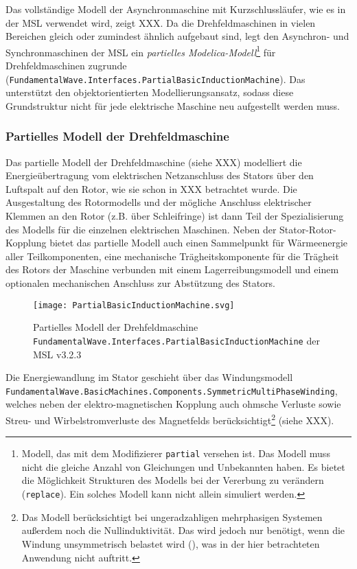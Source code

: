 Das vollständige Modell der Asynchronmaschine mit Kurzschlussläufer, wie
es in der MSL verwendet wird, zeigt XXX. Da die Drehfeldmaschinen in
vielen Bereichen gleich oder zumindest ähnlich aufgebaut sind, legt
\cite{ @kralModelicaObjektorientierteModellbildung2019 } den Asynchron-
und Synchronmaschinen der MSL ein \emph{partielles
Modelica-Modell}\footnote{Modell, das mit dem Modifizierer
  \texttt{partial} versehen ist. Das Modell muss nicht die gleiche
  Anzahl von Gleichungen und Unbekannten haben. Es bietet die
  Möglichkeit Strukturen des Modells bei der Vererbung zu verändern
  (\texttt{replace}). Ein solches Modell kann nicht allein simuliert
  werden.} für Drehfeldmaschinen zugrunde
(\texttt{FundamentalWave.Interfaces.PartialBasicInductionMachine}). Das
unterstützt den objektorientierten Modellierungsansatz, sodass diese
Grundstruktur nicht für jede elektrische Maschine neu aufgestellt werden
muss.

\hypertarget{partielles-modell-der-drehfeldmaschine}{%
\subsubsection{Partielles Modell der
Drehfeldmaschine}\label{partielles-modell-der-drehfeldmaschine}}

Das partielle Modell der Drehfeldmaschine (siehe XXX) modelliert die
Energieübertragung vom elektrischen Netzanschluss des Stators über den
Luftspalt auf den Rotor, wie sie schon in XXX betrachtet wurde. Die
Ausgestaltung des Rotormodells und der mögliche Anschluss elektrischer
Klemmen an den Rotor (z.B. über Schleifringe) ist dann Teil der
Spezialisierung des Modells für die einzelnen elektrischen Maschinen.
Neben der Stator-Rotor-Kopplung bietet das partielle Modell auch einen
Sammelpunkt für Wärmeenergie aller Teilkomponenten, eine mechanische
Trägheitskomponente für die Trägheit des Rotors der Maschine verbunden
mit einem Lagerreibungsmodell und einem optionalen mechanischen
Anschluss zur Abstützung des Stators.

\begin{figure}
\centering
\texttt{[image: PartialBasicInductionMachine.svg]}
\caption{Partielles Modell der Drehfeldmaschine
\texttt{FundamentalWave.Interfaces.PartialBasicInductionMachine} der MSL
v3.2.3}
\end{figure}

Die Energiewandlung im Stator geschieht über das Windungsmodell
\texttt{FundamentalWave.BasicMachines.Components.SymmetricMultiPhaseWinding},
welches neben der elektro-magnetischen Kopplung auch ohmsche Verluste
sowie Streu- und Wirbelstromverluste des Magnetfelds
berücksichtigt\footnote{Das Modell berücksichtigt bei ungeradzahligen
  mehrphasigen Systemen außerdem noch die Nullinduktivität. Das wird
  jedoch nur benötigt, wenn die Windung unsymmetrisch belastet wird
  (\cite[S. 193]{kralModelicaObjektorientierteModellbildung2019}), was
  in der hier betrachteten Anwendung nicht auftritt.} (siehe XXX).

